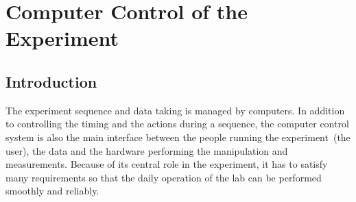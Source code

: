 
\chapter{Computer Control of the Experiment}
\label{ch:computer-control}

\section{Introduction}
\label{ch:computer-control:introduction}

The experiment sequence and data taking is managed by computers.
In addition to controlling the timing and the actions during a sequence,
the computer control system is also the main interface
between the people running the experiment~(the user),
the data and the hardware performing the manipulation and measurements.
Because of its central role in the experiment,
it has to satisfy many requirements so that
the daily operation of the lab can be performed smoothly and reliably.
